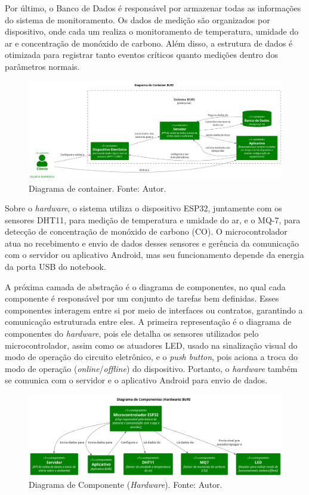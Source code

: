 Por último, o Banco de Dados é responsável por armazenar todas as informações do sistema de monitoramento. Os dados de medição são organizados por dispositivo, onde 
cada um realiza o monitoramento de temperatura, umidade do ar e concentração de monóxido de carbono. Além disso, a estrutura de dados é otimizada para registrar tanto eventos críticos quanto 
medições dentro dos parâmetros normais.

\begin{figure}[ht]
    \centering
    \includegraphics[width=.94\textwidth]{img/conteiner-diagram.png}
    \caption{Diagrama de container. Fonte: Autor.}\label{figConteinerDiagram}
\end{figure}

Sobre o \textit{hardware}, o sistema utiliza o dispositivo ESP32, juntamente com os sensores DHT11, para medição de temperatura e umidade do ar, e o MQ-7, para 
detecção de concentração de monóxido de carbono (CO). O microcontrolador atua no recebimento e envio de dados desses sensores e gerência da comunicação com o servidor ou aplicativo Android, mas seu funcionamento depende da energia da porta USB do 
notebook.

A próxima camada de abstração é o diagrama de componentes, no qual cada componente é responsável por um conjunto de tarefas bem definidas. Esses componentes interagem entre si por meio de interfaces ou contratos, 
garantindo a comunicação estruturada entre eles. A primeira representação é o diagrama de componentes do \textit{hardware}, pois ele detalha os sensores utilizados pelo microcontrolador, assim como 
os atuadores LED, usado na sinalização visual do modo de operação do circuito eletrônico, e o \textit{push button}, pois aciona a troca do modo de operação (\textit{online}/\textit{offline}) do dispositivo. Portanto, 
o \textit{hardware} também se comunica com o servidor e o aplicativo Android para envio de dados.

\begin{figure}[ht]
    \centering
    \includegraphics[width=.88\textwidth]{img/component-diagram-hardware.png}
    \caption{Diagrama de Componente (\textit{Hardware}). Fonte: Autor.}\label{figComponentHardware}
\end{figure}

